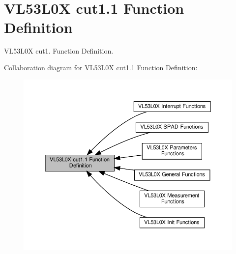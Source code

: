\hypertarget{group__VL53L0X__cut11__group}{}\section{V\+L53\+L0X cut1.1 Function Definition}
\label{group__VL53L0X__cut11__group}


V\+L53\+L0X cut1. Function Definition.  


Collaboration diagram for V\+L53\+L0X cut1.1 Function Definition\+:\nopagebreak
\begin{figure}[H]
\begin{center}
\leavevmode
\includegraphics[width=350pt]{group__VL53L0X__cut11__group}
\end{center}
\end{figure}
